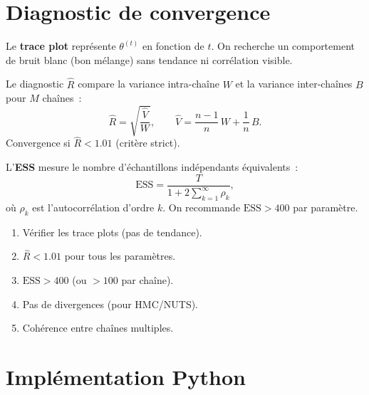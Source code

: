 \section{Diagnostic de convergence}

\begin{definition}
Le \textbf{trace plot} repr\'esente $\theta^{(t)}$ en fonction de $t$.
On recherche un comportement de \og bruit blanc \fg (bon m\'elange)
sans tendance ni corr\'elation visible.
\end{definition}

\begin{definition}
Le diagnostic $\hat{R}$ compare la variance intra-cha\^ine $W$ et la
variance inter-cha\^ines $B$ pour $M$ cha\^ines~:
\[
  \hat{R} = \sqrt{\frac{\hat{V}}{W}}, \qquad
  \hat{V} = \frac{n-1}{n}\,W + \frac{1}{n}\,B.
\]
Convergence si $\hat{R} < 1.01$ (crit\`ere strict).
\end{definition}

\begin{definition}
L'\textbf{ESS} mesure le nombre d'\'echantillons ind\'ependants
\'equivalents~:
\[
  \text{ESS} = \frac{T}{1 + 2\sum_{k=1}^\infty \rho_k},
\]
o\`u $\rho_k$ est l'autocorr\'elation d'ordre $k$. On recommande
$\text{ESS} > 400$ par param\`etre.
\end{definition}

\begin{formules}[title=\textbf{Check-list des diagnostics MCMC}]
\begin{enumerate}
  \item V\'erifier les trace plots (pas de tendance).
  \item $\hat{R} < 1.01$ pour tous les param\`etres.
  \item $\text{ESS} > 400$ (ou $> 100$ par cha\^ine).
  \item Pas de divergences (pour HMC/NUTS).
  \item Coh\'erence entre cha\^ines multiples.
\end{enumerate}
\end{formules}

\section{Impl\'ementation Python}

